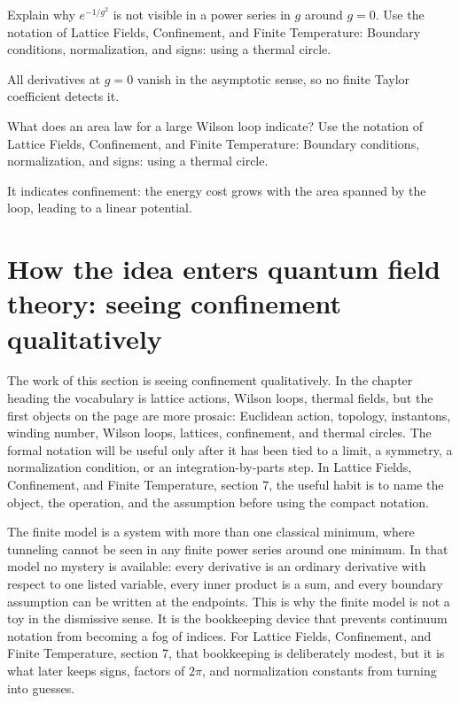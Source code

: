 \begin{exercise}
Explain why \(e^{-1/g^2}\) is not visible in a power series in \(g\) around \(g=0\).  Use the notation of Lattice Fields, Confinement, and Finite Temperature: Boundary conditions, normalization, and signs: using a thermal circle.
\begin{answer}
All derivatives at \(g=0\) vanish in the asymptotic sense, so no finite Taylor coefficient detects it.
\end{answer}
\end{exercise}

\begin{exercise}
What does an area law for a large Wilson loop indicate?  Use the notation of Lattice Fields, Confinement, and Finite Temperature: Boundary conditions, normalization, and signs: using a thermal circle.
\begin{answer}
It indicates confinement: the energy cost grows with the area spanned by the loop, leading to a linear potential.
\end{answer}
\end{exercise}



\section{How the idea enters quantum field theory: seeing confinement qualitatively}

The work of this section is seeing confinement qualitatively.  In the chapter heading the vocabulary is lattice actions, Wilson loops, thermal fields, but the first objects on the page are more prosaic: Euclidean action, topology, instantons, winding number, Wilson loops, lattices, confinement, and thermal circles.  The formal notation will be useful only after it has been tied to a limit, a symmetry, a normalization condition, or an integration-by-parts step.  In Lattice Fields, Confinement, and Finite Temperature, section 7, the useful habit is to name the object, the operation, and the assumption before using the compact notation.

The finite model is a system with more than one classical minimum, where tunneling cannot be seen in any finite power series around one minimum.  In that model no mystery is available: every derivative is an ordinary derivative with respect to one listed variable, every inner product is a sum, and every boundary assumption can be written at the endpoints.  This is why the finite model is not a toy in the dismissive sense.  It is the bookkeeping device that prevents continuum notation from becoming a fog of indices.  For Lattice Fields, Confinement, and Finite Temperature, section 7, that bookkeeping is deliberately modest, but it is what later keeps signs, factors of \(2\pi\), and normalization constants from turning into guesses.

